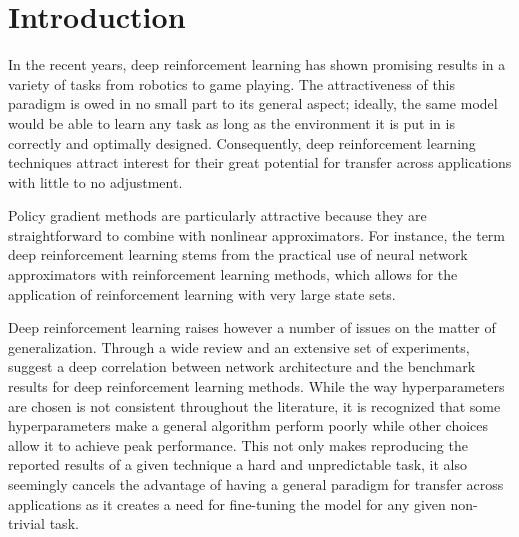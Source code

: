 \section{Introduction}
\label{sec:intro}

In the recent years, deep reinforcement learning has shown promising results in a variety of tasks from robotics to game playing. The attractiveness of this paradigm is owed in no small part to its general aspect; ideally, the same model would be able to learn any task as long as the environment it is put in is correctly and optimally designed. Consequently, deep reinforcement learning techniques attract interest for their great potential for transfer across applications with little to no adjustment.

Policy gradient methods are particularly attractive because they are straightforward to combine with nonlinear approximators. For instance, the term deep reinforcement learning stems from the practical use of neural network approximators with reinforcement learning methods, which allows for the application of reinforcement learning with very large state sets. 

Deep reinforcement learning raises however a number of issues on the matter of generalization. Through a wide review and an extensive set of experiments, \cite{henderson2017deep} suggest a deep correlation between network architecture and the benchmark results for deep reinforcement learning methods. While the way hyperparameters are chosen is not consistent throughout the literature, it is recognized that some hyperparameters make a general algorithm perform poorly while other choices allow it to achieve peak performance. This not only makes reproducing the reported results of a given technique a hard and unpredictable task, it also seemingly cancels the advantage of having a general paradigm for transfer across applications as it creates a need for fine-tuning the model for any given non-trivial task.


